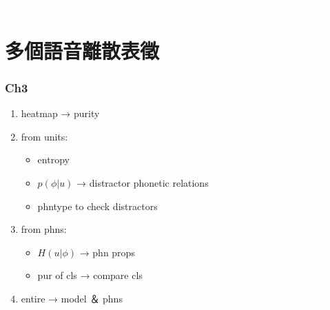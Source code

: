 \begin{figure}\centering
\includegraphics[width=\linewidth]{figures/--plhd.png}
\end{figure}




 
\chapter{多個語音離散表徵} \cite{-}


\subsection{Ch3}

\begin{enumerate}
    \item heatmap → purity
    \item from units:
      \begin{itemize}
        \item entropy
        \item $p(\phi|u)$ → distractor phonetic relations
        \item phntype to check distractors
      \end{itemize}
    \item from phns:
      \begin{itemize}
        \item $H(u|\phi)$ → phn props
        \item pur of cls → compare cls
      \end{itemize}
    \item entire → model ＆ phns
\end{enumerate}


\cite{-}  %
